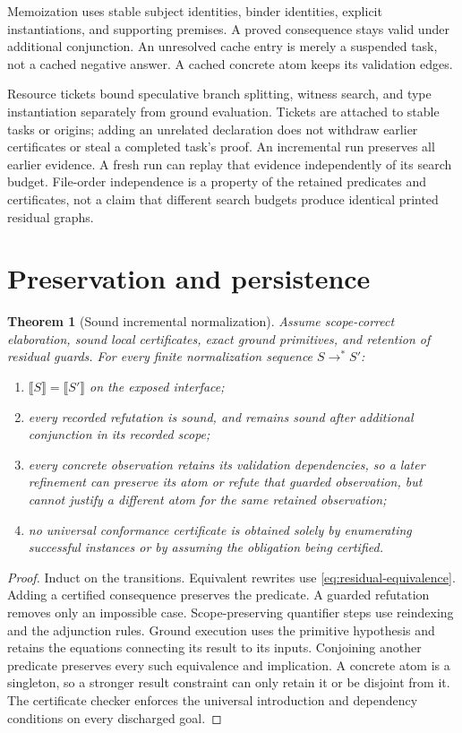 \documentclass[11pt,a4paper,oneside]{report}
\newcommand{\sem}[1]{\llbracket #1\rrbracket}
\newtheorem{theorem}[definition]{Theorem}
\theoremstyle{remark}
\begin{document}
Memoization uses stable subject identities, binder identities, explicit
instantiations, and supporting premises. A proved consequence stays valid under
additional conjunction. An unresolved cache entry is merely a suspended task,
not a cached negative answer. A cached concrete atom keeps its validation edges.

Resource tickets bound speculative branch splitting, witness search, and type
instantiation separately from ground evaluation. Tickets are attached to stable
tasks or origins; adding an unrelated declaration does not withdraw earlier
certificates or steal a completed task's proof. An incremental run preserves
all earlier evidence. A fresh run can replay that evidence independently of its
search budget. File-order independence is a property of the retained predicates
and certificates, not a claim that different search budgets produce identical
printed residual graphs.

\section{Preservation and persistence}
\begin{theorem}[Sound incremental normalization]\label{thm:residual-sound}
Assume scope-correct elaboration, sound local certificates, exact ground
primitives, and retention of residual guards. For every finite normalization
sequence $S\longrightarrow^* S'$:
\begin{enumerate}
\item $\sem S=\sem{S'}$ on the exposed interface;
\item every recorded refutation is sound, and remains sound after additional
conjunction in its recorded scope;
\item every concrete observation retains its validation dependencies, so a
later refinement can preserve its atom or refute that guarded observation, but
cannot justify a different atom for the same retained observation;
\item no universal conformance certificate is obtained solely by enumerating
successful instances or by assuming the obligation being certified.
\end{enumerate}
\end{theorem}
\begin{proof}
Induct on the transitions. Equivalent rewrites use
\cref{eq:residual-equivalence}. Adding a certified consequence preserves the
predicate. A guarded refutation removes only an impossible case. Scope-preserving
quantifier steps use reindexing and the adjunction rules. Ground execution uses
the primitive hypothesis and retains the equations connecting its result to its
inputs. Conjoining another predicate preserves every such equivalence and
implication. A concrete atom is a singleton, so a stronger result constraint can
only retain it or be disjoint from it. The certificate checker enforces the
universal introduction and dependency conditions on every discharged goal.
\end{proof}
\end{document}
